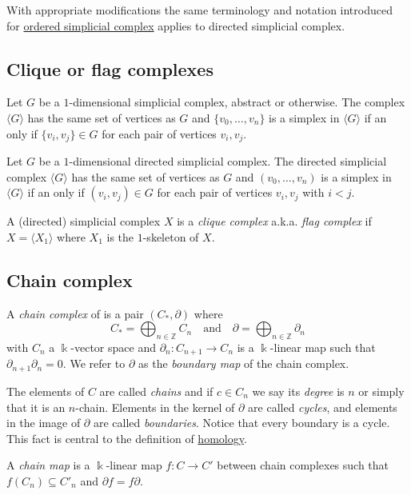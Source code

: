 \documentclass{amsart}
\begin{document}
	With appropriate modifications the same terminology and notation introduced for \hyperref[ordered simplicial complex]{ordered simplicial complex} applies to directed simplicial complex.
	
	\subsection*{Clique or flag complexes} \label{clique or flag complexes}
	
	Let $G$ be a $1$-dimensional simplicial complex, abstract or otherwise. The complex $\langle G \rangle$ has the same set of vertices as $G$ and $\{v_0, \dots, v_n\}$ is a simplex in $\langle G \rangle$ if an only if $\{v_i, v_j\} \in G$ for each pair of vertices $v_i, v_j$. 
	
	Let $G$ be a $1$-dimensional directed simplicial complex. The directed simplicial complex $\langle G \rangle$ has the same set of vertices as $G$ and $(v_0, \dots, v_n)$ is a simplex in $\langle G \rangle$ if an only if $(v_i, v_j) \in G$ for each pair of vertices $v_i, v_j$ with $i < j$. 
	
	A (directed) simplicial complex $X$ is a \textit{clique complex} a.k.a. \textit{flag complex} if $X = \langle X_1 \rangle$ where $X_1$ is the $1$-skeleton of $X$. 
	
	\subsection*{Chain complex} \label{chain complex}
	
	A \textit{chain complex} of is a pair $(C_*, \partial)$ where
	\begin{equation*}
	C_* = \bigoplus_{n \in \mathbb Z} C_n \quad \mathrm{and} \quad \partial = \bigoplus_{n \in \mathbb Z} \partial_n
	\end{equation*}
	with $C_n$ a $\Bbbk$-vector space and $\partial_n : C_{n+1} \to C_n$ is a $\Bbbk$-linear map such that $\partial_{n+1} \partial_n = 0$. We refer to $\partial$ as the \textit{boundary map} of the chain complex.
	
	The elements of $C$ are called \textit{chains} and if $c \in C_n$ we say its \textit{degree} is $n$ or simply that it is an $n$-chain. Elements in the kernel of $\partial$ are called \textit{cycles}, and elements in the image of $\partial$ are called \textit{boundaries}. Notice that every boundary is a cycle. This fact is central to the definition of \hyperref[homology]{homology}.
	
	A \textit{chain map} is a $\Bbbk$-linear map $f : C \to C'$ between chain complexes such that $f(C_n) \subseteq C'_n$ and $\partial f = f \partial$.
	
\end{document}
